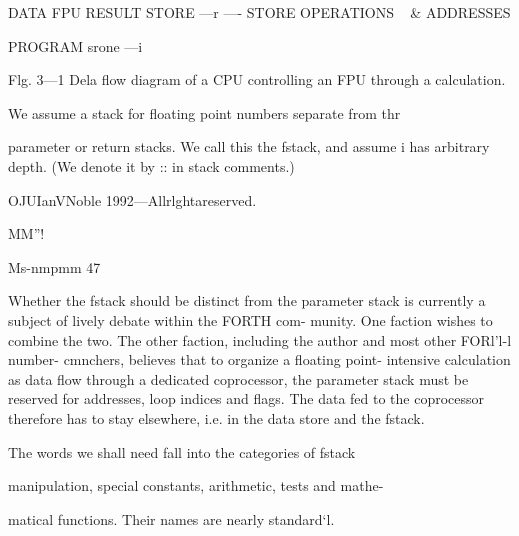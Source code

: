  

 

 

 

 

 

 

 

 

 

 

 

 

 

DATA FPU RESULT
STORE —r —- STORE
OPERATIONS
~ &
ADDRESSES

 

 

 

 

PROGRAM
srone —i

 

 

 

 

 

Flg. 3—1 Dela flow diagram of a CPU controlling an FPU through a
calculation.

We assume a stack for floating point numbers separate from thr

parameter or return stacks. We call this the fstack, and assume i
has arbitrary depth. (We denote it by :: in stack comments.)

OJUIanVNoble 1992—Allrlghtareserved.

MM”!

 

Ms-nmpmm 47

Whether the fstack should be distinct from the parameter stack
is currently a subject of lively debate within the FORTH com-
munity. One faction wishes to combine the two. The other
faction, including the author and most other FORl'l-l number-
cmnchers, believes that to organize a floating point- intensive
calculation as data ﬂow through a dedicated coprocessor, the
parameter stack must be reserved for addresses, loop indices and
ﬂags. The data fed to the coprocessor therefore has to stay
elsewhere, i.e. in the data store and the fstack.

The words we shall need fall into the categories of fstack

manipulation, special constants, arithmetic, tests and mathe-

matical functions. Their names are nearly standard‘l.

